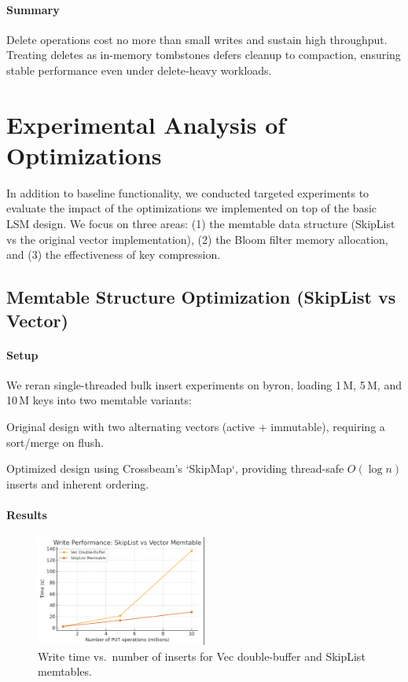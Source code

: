 \documentclass[10pt]{article}
\begin{document}
\paragraph{Summary}
Delete operations cost no more than small writes and sustain high throughput. Treating deletes as in-memory tombstones defers cleanup to compaction, ensuring stable performance even under delete‐heavy workloads.

\section{Experimental Analysis of Optimizations}

In addition to baseline functionality, we conducted targeted experiments to evaluate the impact of the optimizations we implemented on top of the basic LSM design. We focus on three areas: (1) the memtable data structure (SkipList vs the original vector implementation), (2) the Bloom filter memory allocation, and (3) the effectiveness of key compression.

\subsection{Memtable Structure Optimization (SkipList vs Vector)}

\paragraph{Setup}
We reran single-threaded bulk insert experiments on byron, loading 1\,M, 5\,M, and 10\,M keys into two memtable variants:
\begin{description}[leftmargin=1em,labelwidth=*,itemsep=0.5ex]
  \item[Vec Double-Buffer] Original design with two alternating vectors (active + immutable), requiring a sort/merge on flush.
  \item[Lock-Free SkipList] Optimized design using Crossbeam’s `SkipMap`, providing thread-safe $O(\log n)$ inserts and inherent ordering.
\end{description}

\paragraph{Results}
\begin{figure}[htbp]
  \centering
  \includegraphics[width=0.5\textwidth]{skiplist_v_memtable.png}
  \caption{Write time vs.\ number of inserts for Vec double-buffer and SkipList memtables.}
  \label{fig:memtable_comparison}
\end{figure}
\end{document}
